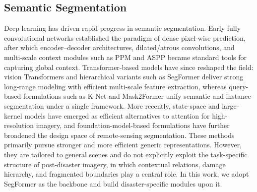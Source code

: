 \documentclass[lettersize,journal]{IEEEtran}
\begin{document}
\subsection{Semantic Segmentation}
Deep learning has driven rapid progress in semantic segmentation. Early fully convolutional networks established the paradigm of dense pixel-wise prediction, after which encoder--decoder architectures, dilated/atrous convolutions, and multi-scale context modules such as PPM and ASPP became standard tools for capturing global context\cite{longFullyConvolutionalNetworks2015,ronnebergerUNetConvolutionalNetworks2015,chenEncoderDecoderAtrousSeparable2018,zhaoPyramidSceneParsing2017}.
Transformer-based models have since reshaped the field: vision Transformers and hierarchical variants such as SegFormer deliver strong long-range modeling with efficient multi-scale feature extraction, whereas query-based formulations such as K-Net and Mask2Former unify semantic and instance segmentation under a single framework\cite{dosovitskiyImageWorth16x162020,xie2021segformer,zhang2021knet,NEURIPS2021_950a4152}. 
More recently, state-space and large-kernel models have emerged as efficient alternatives to attention for high-resolution imagery, and foundation-model-based formulations have further broadened the design space of remote-sensing segmentation\cite{lou2025overlock, SegMAN, xiao2025spatialmamba, yeExploitingFoundationModels2026, biViRefSAMVisualReference2026}. 
These methods primarily pursue stronger and more efficient generic representations. However, they are tailored to general scenes and do not explicitly exploit the task-specific structure of post-disaster imagery, in which contextual relations, damage hierarchy, and fragmented boundaries play a central role. In this work, we adopt SegFormer as the backbone and build disaster-specific modules upon it.
\end{document}
